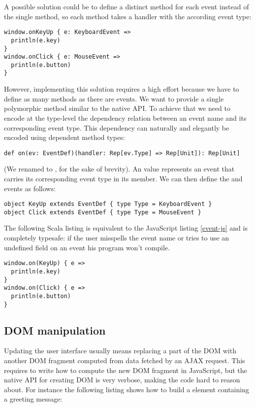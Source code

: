 \documentclass[american,english,runningheads]{llncs}
\begin{document}
A possible solution could be to define a distinct method for each event instead of the single  method, so each method takes a handler with the according event type:

\begin{lstlisting}
window.onKeyUp { e: KeyboardEvent =>
  println(e.key)
}
window.onClick { e: MouseEvent =>
  println(e.button)
}
\end{lstlisting}

However, implementing this solution requires a high effort because we have to define as many methods as there are events. We want to provide a single polymorphic method similar to the native API. To achieve that we need to encode at the type-level the dependency relation between an event name and its corresponding event type. This dependency can naturally and elegantly be encoded using dependent method types:

\begin{lstlisting}
def on(ev: EventDef)(handler: Rep[ev.Type] => Rep[Unit]): Rep[Unit]
\end{lstlisting}

(We renamed  to , for the sake of brevity). An  value represents an event that carries its corresponding event type in its  member. We can then define the  and  events as follows:

\begin{lstlisting}
object KeyUp extends EventDef { type Type = KeyboardEvent }
object Click extends EventDef { type Type = MouseEvent }
\end{lstlisting}

The following Scala listing is equivalent to the JavaScript listing \ref{event-js} and is completely typesafe: if the user misspells the event name or tries to use an undefined field on an event his program won’t compile.

\begin{lstlisting}
window.on(KeyUp) { e =>
  println(e.key)
}
window.on(Click) { e =>
  println(e.button)
}
\end{lstlisting}

\subsection{DOM manipulation}
\label{forest}

Updating the user interface usually means replacing a part of the DOM with another DOM fragment computed from data fetched by an AJAX request. This requires to write how to compute the new DOM fragment in JavaScript, but the native API for creating DOM is very verbose, making the code hard to reason about. For instance the following listing shows how to build a  element containing a greeting message:
\end{document}
